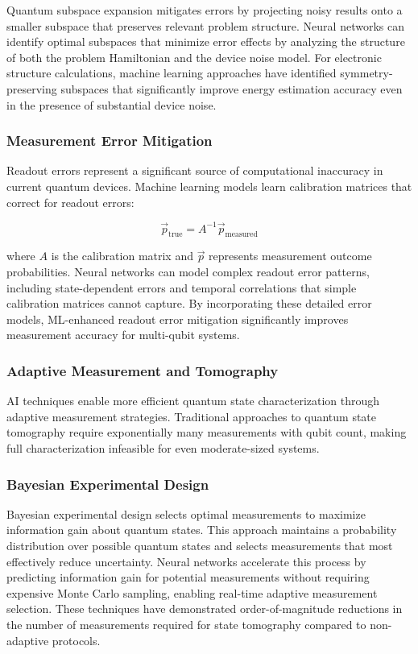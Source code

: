 Quantum subspace expansion mitigates errors by projecting noisy results onto a smaller subspace that preserves relevant problem structure. Neural networks can identify optimal subspaces that minimize error effects by analyzing the structure of both the problem Hamiltonian and the device noise model. For electronic structure calculations, machine learning approaches have identified symmetry-preserving subspaces that significantly improve energy estimation accuracy even in the presence of substantial device noise.

\subsubsection{Measurement Error Mitigation}

Readout errors represent a significant source of computational inaccuracy in current quantum devices. Machine learning models learn calibration matrices that correct for readout errors:

\begin{equation}
\vec{p}_{\text{true}} = A^{-1} \vec{p}_{\text{measured}}
\end{equation}

where $A$ is the calibration matrix and $\vec{p}$ represents measurement outcome probabilities. Neural networks can model complex readout error patterns, including state-dependent errors and temporal correlations that simple calibration matrices cannot capture. By incorporating these detailed error models, ML-enhanced readout error mitigation significantly improves measurement accuracy for multi-qubit systems.

\subsubsection{Adaptive Measurement and Tomography}

AI techniques enable more efficient quantum state characterization through adaptive measurement strategies. Traditional approaches to quantum state tomography require exponentially many measurements with qubit count, making full characterization infeasible for even moderate-sized systems.

\subsubsection{Bayesian Experimental Design}

Bayesian experimental design selects optimal measurements to maximize information gain about quantum states. This approach maintains a probability distribution over possible quantum states and selects measurements that most effectively reduce uncertainty. Neural networks accelerate this process by predicting information gain for potential measurements without requiring expensive Monte Carlo sampling, enabling real-time adaptive measurement selection. These techniques have demonstrated order-of-magnitude reductions in the number of measurements required for state tomography compared to non-adaptive protocols.

